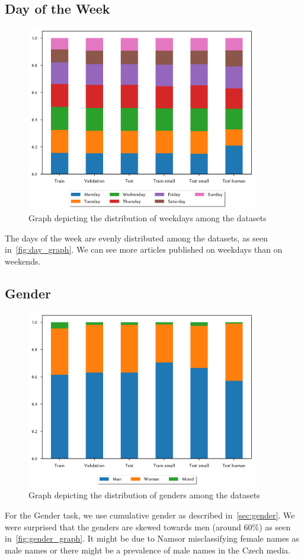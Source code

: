 \subsection{Day of the Week}
\begin{figure}[H]
    \centering
    \includegraphics[width=0.9\textwidth]{img/tasks_graph/day_of_week.pdf}
    \caption{Graph depicting the distribution of weekdays among the datasets}
    \label{fig:day_graph}
\end{figure}
The days of the week are evenly distributed among the datasets, as seen in~\autoref{fig:day_graph}.
We can see more articles published on weekdays than on weekends.

\subsection{Gender}
\begin{figure}[H]
    \centering
    \includegraphics[width=0.9\textwidth]{img/tasks_graph/authors_cum_gender.pdf}
    \caption{Graph depicting the distribution of genders among the datasets}
    \label{fig:gender_graph}
\end{figure}
For the Gender task, we use cumulative gender as described in~\autoref{sec:gender}.
We were surprised that the genders are skewed towards men (around $60\%$) as seen in~\autoref{fig:gender_graph}.
It might be due to Namsor misclassifying female names as male names or there might be a prevalence of male names in the Czech media.
